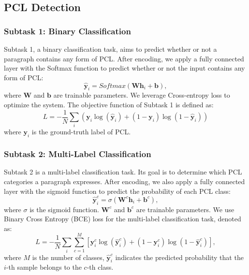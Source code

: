 \documentclass[11pt]{article}
\begin{document}
\subsection{PCL Detection}
\subsubsection{Subtask 1: Binary Classification}
Subtask 1, a binary classification task, aims to predict whether or not a paragraph contains any form of PCL.
After encoding, we apply a fully connected layer with the Softmax function to predict whether or not the input contains any form of PCL:
\begin{equation}
    \hat{\mathbf{y}}_i = Softmax(\mathbf{W} \mathbf{h}_i + \mathbf{b}),
\end{equation}
where $\mathbf{W}$ and $\mathbf{b}$ are trainable parameters.
We leverage Cross-entropy loss to optimize the system. The objective function of Subtask 1 is defined as:
\begin{equation}
    L = - \frac{1}{N}\sum_i (\mathbf{y}_i \log (\hat{\mathbf{y}}_i)  + (1- \mathbf{y}_i) \log (1-\hat{\mathbf{y}}_i))
\end{equation}
where $\mathbf{y}_i$ is the ground-truth label of PCL.

\subsubsection{Subtask 2: Multi-Label Classification}
Subtask 2 is a multi-label classification task. Its goal is to determine  which PCL categories a paragraph expresses. 
After encoding, we also apply a fully connected layer with the sigmoid function to predict the probability of each PCL class:
\begin{equation}
    \hat{\mathbf{y}}_i^c = \sigma(\mathbf{W}^c \mathbf{h}_{i} + \mathbf{b}^c),
\end{equation}
where $\sigma$ is the sigmoid function.
$\mathbf{W}^c$ and $\mathbf{b}^c$ are trainable parameters.
We use Binary Cross Entropy (BCE) loss \citep{DBLP:journals/pami/BengioCV13} for the multi-label classification task, denoted as: 
\begin{equation}
    L = - \frac{1}{N}\sum_i \sum_{c=1}^M [\mathbf{y}_{i}^c \log (\hat{\mathbf{y}}_i^c) + (1-\mathbf{y}_{i}^c) \log (1-\hat{\mathbf{y}}_i^c)  ],
\end{equation}
where $M$ is the number of classes, $\hat{\mathbf{y}}_i^c$ indicates the predicted probability that the $i$-th sample belongs to the $c$-th class.
\end{document}
